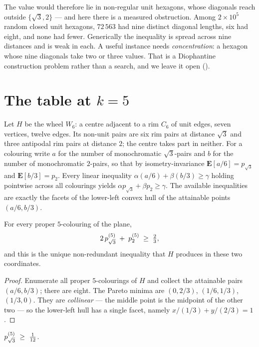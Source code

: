 The value would therefore lie in non-regular unit hexagons, whose diagonals
reach outside $\{\sqrt3,2\}$ --- and here there is a measured obstruction. Among
$2\times10^5$ random closed unit hexagons, $72\,563$ had nine distinct diagonal
lengths, six had eight, and none had fewer. Generically the inequality is spread
across nine distances and is weak in each. A useful instance needs
\emph{concentration}: a hexagon whose nine diagonals take two or three values.
That is a Diophantine construction problem rather than a search, and we leave it
open ().

\section{The table at $k=5$}

Let $H$ be the wheel $W_6$: a centre adjacent to a rim $C_6$ of unit edges,
seven vertices, twelve edges. Its non-unit pairs are six rim pairs at distance
$\sqrt3$ and three antipodal rim pairs at distance $2$; the centre takes part in
neither. For a colouring write $a$ for the number of monochromatic
$\sqrt3$-pairs and $b$ for the number of monochromatic $2$-pairs, so that by
isometry-invariance $\mathbf{E}[a/6]=p_{\sqrt3}$ and $\mathbf{E}[b/3]=p_2$. Every
linear inequality $\alpha(a/6)+\beta(b/3)\ge\gamma$ holding pointwise across all
colourings yields $\alpha p_{\sqrt3}+\beta p_2\ge\gamma$. The available
inequalities are exactly the facets of the lower-left convex hull of the
attainable points $(a/6,b/3)$.

\begin{theorem}
\label{thm:facet}
For every proper $5$-colouring of the plane,
\[
2\,p^{(5)}_{\sqrt3} \;+\; p^{(5)}_{2} \;\ge\; \tfrac23 ,
\]
and this is the unique non-redundant inequality that $H$ produces in these two
coordinates.
\end{theorem}

\begin{proof}
Enumerate all proper $5$-colourings of $H$ and collect the attainable pairs
$(a/6,b/3)$; there are eight. The Pareto minima are $(0,2/3)$, $(1/6,1/3)$,
$(1/3,0)$. They are \emph{collinear} --- the middle point is the midpoint of the
other two --- so the lower-left hull has a single facet, namely
$x/(1/3)+y/(2/3)=1$.
\end{proof}

\begin{theorem}
\label{thm:112}
$p^{(5)}_{\sqrt3}\ \ge\ \tfrac1{12}$.
\end{theorem}

